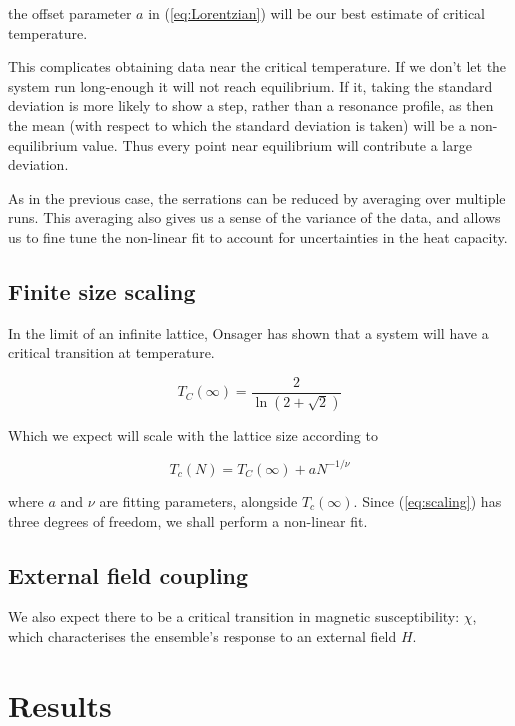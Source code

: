 \documentclass[11pt]{article}
\begin{document}
the offset parameter \(a\) in (\ref{eq:Lorentzian}) will be our best estimate of critical temperature. 

This complicates obtaining data near the critical temperature. If we don't let the system run long-enough it will not reach equilibrium. If it, taking the standard deviation is more likely to show a step, rather than a resonance profile, as then the mean (with respect to which the standard deviation is taken) will be a non-equilibrium value. Thus every point near equilibrium will contribute a large deviation.

As in the previous case, the serrations can be reduced by averaging over multiple runs. This averaging also gives us a sense of the variance of the data, and allows us to fine tune the non-linear fit to account for uncertainties in the heat capacity.

\subsection{Finite size scaling}\label{sec:scaling}

In the limit of an infinite lattice, Onsager has shown that a system will have a critical transition at temperature. 

\begin{equation}\label{eq:onsager}
  T_C (\infty)= \frac{2}{\ln(2 + \sqrt{2})}
\end{equation}

Which we expect will scale with the lattice size according to

\begin{equation}\label{eq:scaling}
  T_c(N) = T_C(\infty) + a N ^{-1/\nu}
\end{equation}

where \(a\) and \(\nu\) are fitting parameters, alongside \(T_c(\infty)\). Since (\ref{eq:scaling}) has three degrees of freedom, we shall perform a non-linear fit.

\subsection{External field coupling}\label{sec:chi}

We also expect there to be a critical transition in magnetic susceptibility: \(\chi \), which characterises the ensemble's response to an external field \(H\).

\section{Results}
\end{document}
